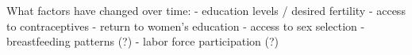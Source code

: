 

What factors have changed over time:
    - education levels / desired fertility
    - access to contraceptives
    - return to women's education
    - access to sex selection
    - breastfeeding patterns (?)
    - labor force participation (?)


